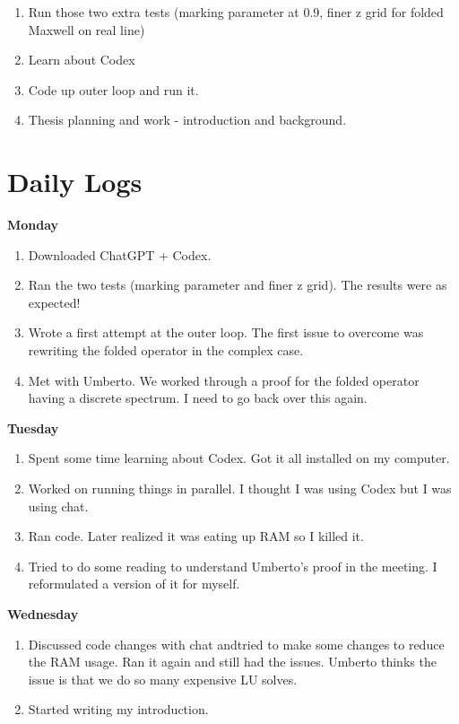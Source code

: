 \documentclass[12pt,a4paper]{article}
\begin{document}
\begin{enumerate}

    \item Run those two extra tests (marking parameter at 0.9, finer z grid for folded Maxwell on real line)
    \item Learn about Codex
    \item Code up outer loop and run it.
    \item Thesis planning and work - introduction and background.
    

\end{enumerate}


\section{Daily Logs}

\textbf{Monday} 
\begin{enumerate}
    \item Downloaded ChatGPT + Codex.
    \item Ran the two tests (marking parameter and finer z grid). The results were as expected!
    \item Wrote a first attempt at the outer loop. The first issue to overcome was rewriting the folded operator in the complex case. 
    \item Met with Umberto. We worked through a proof for the folded operator having a discrete spectrum. I need to go back over this again.
\end{enumerate}

\textbf{Tuesday}
\begin{enumerate}
\item Spent some time learning about Codex. Got it all installed on my computer.
\item Worked on running things in parallel. I thought I was using Codex but I was using chat.
\item Ran code. Later realized it was eating up RAM so I killed it.
\item Tried to do some reading to understand Umberto's proof in the meeting. I reformulated a version of it for myself.
\end{enumerate}

\textbf{Wednesday}
\begin{enumerate}
\item Discussed code changes with chat andtried to make some changes to reduce the RAM usage. Ran it again and still had the issues. Umberto thinks the issue is that we do so many expensive LU solves. 
\item Started writing my introduction. 
\end{enumerate}
\end{document}
